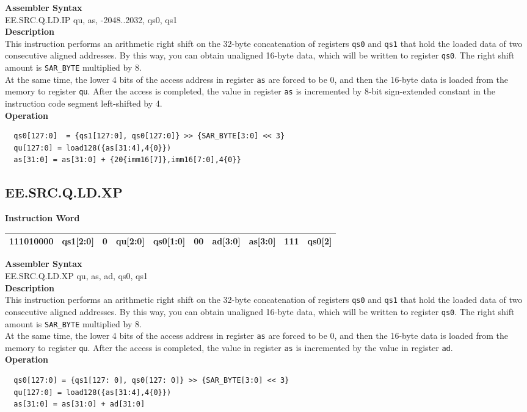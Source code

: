 \textbf{Assembler Syntax} \\
EE.SRC.Q.LD.IP qu, as, -2048..2032, qs0, qs1 \\
\textbf{Description} \\
This instruction performs an arithmetic right shift on the 32-byte concatenation of registers \lstinline{qs0} and \lstinline{qs1} that hold the loaded data of two consecutive aligned addresses. By this way, you can obtain unaligned 16-byte data, which will be written to register \lstinline{qs0}. The right shift amount is \lstinline{SAR_BYTE} multiplied by 8.\\
At the same time, the lower 4 bits of the access address in register \lstinline{as} are forced to be 0, and then the 16-byte data is loaded from the memory to register \lstinline{qu}. After the access is completed, the value in register \lstinline{as} is incremented by 8-bit sign-extended constant in the instruction code segment left-shifted by 4.\\
\textbf{Operation}
\begin{lstlisting}
  qs0[127:0]  = {qs1[127:0], qs0[127:0]} >> {SAR_BYTE[3:0] << 3}
  qu[127:0] = load128({as[31:4],4{0}})
  as[31:0] = as[31:0] + {20{imm16[7]},imm16[7:0],4{0}}
\end{lstlisting}

\clearpage
\subsection{EE.SRC.Q.LD.XP}\label{instruction:EESRCQLDXP}
\setlength\tabcolsep{6pt}
\textbf{Instruction Word} \\
\begin{tabular}{|c|c|c|c|c|c|c|c|c|c|}
	\hline
	111010000 & qs1[2:0] & 0 & qu[2:0] & qs0[1:0] & 00 & ad[3:0] & as[3:0] & 111 & qs0[2] \\
	\hline
\end{tabular}

\textbf{Assembler Syntax} \\
EE.SRC.Q.LD.XP qu, as, ad, qs0, qs1 \\
\textbf{Description} \\
This instruction performs an arithmetic right shift on the 32-byte concatenation of registers \lstinline{qs0} and \lstinline{qs1} that hold the loaded data of two consecutive aligned addresses. By this way, you can obtain unaligned 16-byte data, which will be written to register \lstinline{qs0}. The right shift amount is \lstinline{SAR_BYTE} multiplied by 8.\\
At the same time, the lower 4 bits of the access address in register \lstinline{as} are forced to be 0, and then the 16-byte data is loaded from the memory to register \lstinline{qu}. After the access is completed, the value in register \lstinline{as} is incremented by the value in register \lstinline{ad}.\\
\textbf{Operation}
\begin{lstlisting}
  qs0[127:0] = {qs1[127: 0], qs0[127: 0]} >> {SAR_BYTE[3:0] << 3}
  qu[127:0] = load128({as[31:4],4{0}})
  as[31:0] = as[31:0] + ad[31:0]
\end{lstlisting}

